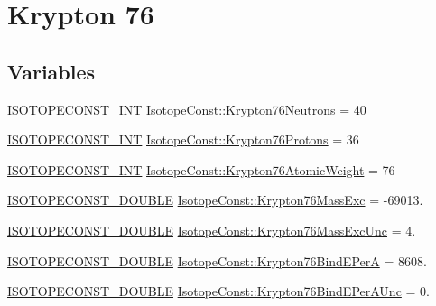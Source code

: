 \hypertarget{group___isotope_const-_krypton-_kr76}{}\section{Krypton 76}
\label{group___isotope_const-_krypton-_kr76}
\subsection*{Variables}
\begin{DoxyCompactItemize}
\item 
\mbox{\hyperlink{group___isotope_const-_macros_ga5f18360b3e99483a35c32d789e62621c}{I\+S\+O\+T\+O\+P\+E\+C\+O\+N\+S\+T\+\_\+\+I\+NT}} \mbox{\hyperlink{group___isotope_const-_krypton-_kr76_gaee1eb11945dacb1aeab3ae4efb5daec1}{Isotope\+Const\+::\+Krypton76\+Neutrons}} = 40
\item 
\mbox{\hyperlink{group___isotope_const-_macros_ga5f18360b3e99483a35c32d789e62621c}{I\+S\+O\+T\+O\+P\+E\+C\+O\+N\+S\+T\+\_\+\+I\+NT}} \mbox{\hyperlink{group___isotope_const-_krypton-_kr76_ga431d772ba975b483e171c1cb7c047c5c}{Isotope\+Const\+::\+Krypton76\+Protons}} = 36
\item 
\mbox{\hyperlink{group___isotope_const-_macros_ga5f18360b3e99483a35c32d789e62621c}{I\+S\+O\+T\+O\+P\+E\+C\+O\+N\+S\+T\+\_\+\+I\+NT}} \mbox{\hyperlink{group___isotope_const-_krypton-_kr76_ga7f81faaab8635af4aeb44d52d19f3379}{Isotope\+Const\+::\+Krypton76\+Atomic\+Weight}} = 76
\item 
\mbox{\hyperlink{group___isotope_const-_macros_ga8f45a7272ce02c0b4c65c44636ed719a}{I\+S\+O\+T\+O\+P\+E\+C\+O\+N\+S\+T\+\_\+\+D\+O\+U\+B\+LE}} \mbox{\hyperlink{group___isotope_const-_krypton-_kr76_gaa1b3eb0c309c3c284b75c4cb695079c9}{Isotope\+Const\+::\+Krypton76\+Mass\+Exc}} = -\/69013.
\item 
\mbox{\hyperlink{group___isotope_const-_macros_ga8f45a7272ce02c0b4c65c44636ed719a}{I\+S\+O\+T\+O\+P\+E\+C\+O\+N\+S\+T\+\_\+\+D\+O\+U\+B\+LE}} \mbox{\hyperlink{group___isotope_const-_krypton-_kr76_gac6f70ae7a62c4a26db76a1baed57335e}{Isotope\+Const\+::\+Krypton76\+Mass\+Exc\+Unc}} = 4.
\item 
\mbox{\hyperlink{group___isotope_const-_macros_ga8f45a7272ce02c0b4c65c44636ed719a}{I\+S\+O\+T\+O\+P\+E\+C\+O\+N\+S\+T\+\_\+\+D\+O\+U\+B\+LE}} \mbox{\hyperlink{group___isotope_const-_krypton-_kr76_gacb315d256ee4568f1b871974e59d9bbc}{Isotope\+Const\+::\+Krypton76\+Bind\+E\+PerA}} = 8608.
\item 
\mbox{\hyperlink{group___isotope_const-_macros_ga8f45a7272ce02c0b4c65c44636ed719a}{I\+S\+O\+T\+O\+P\+E\+C\+O\+N\+S\+T\+\_\+\+D\+O\+U\+B\+LE}} \mbox{\hyperlink{group___isotope_const-_krypton-_kr76_gaea798761990c51fa3ec780627e5f4c7a}{Isotope\+Const\+::\+Krypton76\+Bind\+E\+Per\+A\+Unc}} = 0.

\end{DoxyCompactItemize}
